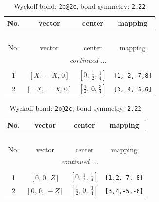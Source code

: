 \documentclass[fleqn,8pt]{jsarticle}
\begin{document}
\renewcommand{\arraystretch}{1.2}
\begin{longtable}{cccc}
\caption{Wyckoff bond: {\tt 2b@2c}, bond symmetry: {\tt 2.22}}
 \\
 \hline \hline
No. & vector & center & mapping \\ \hline \endfirsthead

\multicolumn{3}{l}{\tablename\ \thetable{}} \\
 \hline \hline
No. & vector & center & mapping \\ \hline \endhead

 \hline \hline
\multicolumn{3}{r}{\footnotesize\it continued ...} \\ \endfoot

 \hline \hline
\multicolumn{3}{r}{} \\ \endlastfoot

1 & $\left[ X,\, - X,\, 0 \right]$ & $\left[ 0,\, \frac{1}{2},\, \frac{1}{4} \right]$ & {\tt [1,-2,-7,8]} \\ \hline
2 & $\left[ - X,\, - X,\, 0 \right]$ & $\left[ \frac{1}{2},\, 0,\, \frac{3}{4} \right]$ & {\tt [3,-4,-5,6]} \\
\end{longtable}
\renewcommand{\arraystretch}{1.2}
\begin{longtable}{cccc}
\caption{Wyckoff bond: {\tt 2c@2c}, bond symmetry: {\tt 2.22}}
 \\
 \hline \hline
No. & vector & center & mapping \\ \hline \endfirsthead

\multicolumn{3}{l}{\tablename\ \thetable{}} \\
 \hline \hline
No. & vector & center & mapping \\ \hline \endhead

 \hline \hline
\multicolumn{3}{r}{\footnotesize\it continued ...} \\ \endfoot

 \hline \hline
\multicolumn{3}{r}{} \\ \endlastfoot

1 & $\left[ 0,\, 0,\, Z \right]$ & $\left[ 0,\, \frac{1}{2},\, \frac{1}{4} \right]$ & {\tt [1,2,-7,-8]} \\ \hline
2 & $\left[ 0,\, 0,\, - Z \right]$ & $\left[ \frac{1}{2},\, 0,\, \frac{3}{4} \right]$ & {\tt [3,4,-5,-6]} \\
\end{longtable}
\renewcommand{\arraystretch}{1.2}
\end{document}
